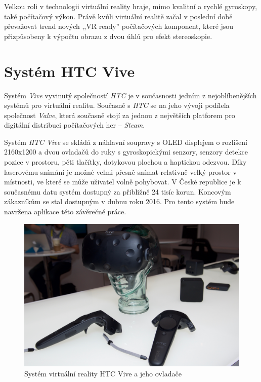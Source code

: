 Velkou roli v technologii virtuální reality hraje, mimo kvalitní a rychlé gyroskopy,
také počítačový výkon. Právě kvůli virtuální realitě začal v poslední
době převažovat trend nových ,,VR ready'' počítačových komponent, které jsou
přizpůsobeny k výpočtu obrazu z dvou úhlů pro efekt stereoskopie. \autocite{vrtech}

\section{Systém HTC Vive}\label{systuxe9m-htc-vive}

Systém \emph{Vive} vyvinutý společností \emph{HTC} je v současnosti jedním z nejoblíbenějších systémů pro virtuální realitu. \autocite{vivepopular} Současně s
\emph{HTC} se na jeho vývoji podílela společnost \emph{Valve}, která současně stojí za jednou z největších platforem pro digitální
distribuci počítačových her -- \emph{Steam}.

Systém \emph{HTC Vive} se skládá z náhlavní soupravy s OLED displejem o
rozlišení 2160x1200 a dvou ovladačů do ruky s gyroskopickými senzory,
senzory detekce pozice v prostoru, pěti tlačítky, dotykovou plochou a
haptickou odezvou. \autocite{vivespec} Díky laserovému snímání je možné velmi přesně snímat
relativně velký prostor v místnosti, ve které se může uživatel volně
pohybovat. V České republice je k současnému datu systém dostupný za
přibližně 24 tisíc korun. \autocite{viveprice} Koncovým zákazníkům se stal dostupným v dubnu
roku 2016. Pro tento systém bude navržena aplikace této závěrečné práce.

\begin{figure}[h!]
\centering
\includegraphics[width=12cm]{src/assets/vive-pre.jpeg}
\caption{Systém virtuální reality HTC Vive a jeho ovladače\autocite{htcvivepre}}
\end{figure}

